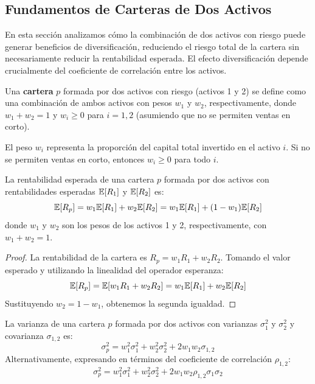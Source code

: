 \subsection{Fundamentos de Carteras de Dos Activos}

En esta sección analizamos cómo la combinación de dos activos con riesgo puede generar beneficios de diversificación, reduciendo el riesgo total de la cartera sin necesariamente reducir la rentabilidad esperada. El efecto diversificación depende crucialmente del coeficiente de correlación entre los activos.

\begin{definicion}
Una \textbf{cartera} $p$ formada por dos activos con riesgo (activos 1 y 2) se define como una combinación de ambos activos con pesos $w_1$ y $w_2$, respectivamente, donde $w_1 + w_2 = 1$ y $w_i \geq 0$ para $i = 1, 2$ (asumiendo que no se permiten ventas en corto).
\end{definicion}

El peso $w_i$ representa la proporción del capital total invertido en el activo $i$. Si no se permiten ventas en corto, entonces $w_i \geq 0$ para todo $i$.

\begin{teorema}
La rentabilidad esperada de una cartera $p$ formada por dos activos con rentabilidades esperadas $\mathbb{E}[R_1]$ y $\mathbb{E}[R_2]$ es:
\begin{equation}
\mathbb{E}[R_p] = w_1 \mathbb{E}[R_1] + w_2 \mathbb{E}[R_2] = w_1 \mathbb{E}[R_1] + (1 - w_1) \mathbb{E}[R_2]
\end{equation}
donde $w_1$ y $w_2$ son los pesos de los activos 1 y 2, respectivamente, con $w_1 + w_2 = 1$.
\end{teorema}

\begin{proof}
La rentabilidad de la cartera es $R_p = w_1 R_1 + w_2 R_2$. Tomando el valor esperado y utilizando la linealidad del operador esperanza:
$$\mathbb{E}[R_p] = \mathbb{E}[w_1 R_1 + w_2 R_2] = w_1 \mathbb{E}[R_1] + w_2 \mathbb{E}[R_2]$$
Sustituyendo $w_2 = 1 - w_1$, obtenemos la segunda igualdad.
\end{proof}

\begin{teorema}
La varianza de una cartera $p$ formada por dos activos con varianzas $\sigma_1^2$ y $\sigma_2^2$ y covarianza $\sigma_{1,2}$ es:
\begin{equation}
\sigma_p^2 = w_1^2 \sigma_1^2 + w_2^2 \sigma_2^2 + 2w_1 w_2 \sigma_{1,2}
\end{equation}
Alternativamente, expresando en términos del coeficiente de correlación $\rho_{1,2}$:
\begin{equation}
\sigma_p^2 = w_1^2 \sigma_1^2 + w_2^2 \sigma_2^2 + 2w_1 w_2 \rho_{1,2} \sigma_1 \sigma_2
\end{equation}
\end{teorema}

